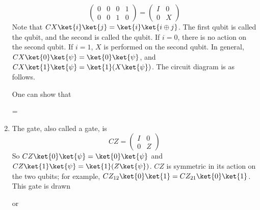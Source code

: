 \begin{enumerate}
\[\begin{pmatrix}
        0 & 0 & 0 & 1 \\
        0 & 0 & 1 & 0
    \end{pmatrix} = \begin{pmatrix}
        I & 0 \\
        0 & X
    \end{pmatrix} \]
    Note that $CX \ket{i} \ket{j} = \ket{i}\ket{i \oplus j}$.
    The first qubit is called the  qubit, and the second is called the  qubit.
    If $i = 0$, there is no action on the second qubit.
    If $i = 1$, $X$ is performed on the second qubit.
    In general, $CX \ket{0}\ket{\psi} = \ket{0}\ket{\psi}$, and $CX \ket{1}\ket{\psi} = \ket{1}(X \ket{\psi})$.
    The circuit diagram is as follows.
    \begin{center}
        \leavevmode
    \end{center}
    One can show that
    \begin{center}
        \leavevmode
        \quad = \quad
    \end{center}
    \item The  gate, also called a  gate, is
    \[ CZ = \begin{pmatrix}
        I & 0 \\
        0 & Z
    \end{pmatrix} \]
    So $CZ \ket{0}\ket{\psi} = \ket{0}\ket{\psi}$ and $CZ \ket{1}\ket{\psi} = \ket{1}(Z\ket{\psi})$.
    $CZ$ is symmetric in its action on the two qubits; for example, $CZ_{12} \ket{0} \ket{1} = CZ_{21} \ket{0} \ket{1}$.
    This gate is drawn
    \begin{center}
        \leavevmode
        \quad or \quad
    \end{center}
\end{enumerate}

